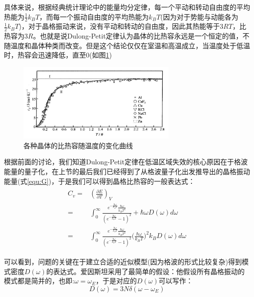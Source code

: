 \documentclass{ctexart}
\begin{document}
                具体来说，根据经典统计理论中的能量均分定律，每一个平动和转动自由度的平均热能为$\frac{1}{2}k_BT$，而每一个振动自由度的平均热能为$k_BT$(因为对于势能与动能各为$\frac{1}{2}k_BT$)，对于晶格振动来说，没有平动和转动的自由度，因此其热能等于$3RT$，比热容为$3R$。也就是说Dulong-Petit定律认为晶体的比热容永远是一个恒定的值，不随温度和晶体种类而改变。但是这个结论仅仅在室温和高温成立，当温度处于低温时，热容会迅速降低，直至0(如图\ref{fig:heatcapacity})
                \begin{figure}[H]
                    \centering
                    \includegraphics[width=0.7\textwidth]{figure/heatcapacity.jpg}
                    \caption{各种晶体的比热容随温度的变化曲线}
                    \label{fig:heatcapacity}
                \end{figure}
                
                根据前面的讨论，我们知道Dulong-Petit定律在低温区域失效的核心原因在于格波能量的量子化，在上节的最后我们已经得到了从格波量子化出发推导出的晶格振动能量(式\eqref{equ:G})，于是我们可以得到晶格比热容的一般表达式：
                \begin{align}\label{heatcapacity}
                    \begin{split}
                        C_v=&\left(\frac{\partial E}{\partial T}\right)_V\\
                        =&\int_0^\infty \frac{e^{-\frac{\hbar\omega}{k_BT}}\frac{\hbar\omega}{k_BT^2}}{(e^{-\frac{\hbar\omega}{k_BT}}-1)^2}+\hbar\omega D(\omega)d\omega\\
                        =& \int_0^\infty \frac{e^{-\frac{\hbar\omega}{k_BT}}\frac{\hbar\omega}{k_BT^2}}{(e^{-\frac{\hbar\omega}{k_BT}}-1)^2}\Big(\frac{\hbar\omega}{k_BT}\Big)^2 k_B D(\omega)d\omega
                    \end{split}
                \end{align}
                
                可以看到，问题的关键在于建立合适的近似模型(因为格波的形式比较复杂)得到模式密度$D(\omega)$的表达式。爱因斯坦采用了最简单的假设：他假设所有晶格振动的模式都是简并的，也即:$\omega=\omega_E$，于是对应的$D(\omega)$可以写作：
                \begin{equation}
                    D(\omega)=3N\delta(\omega-\omega_E)
                \end{equation}
                
\end{document}
